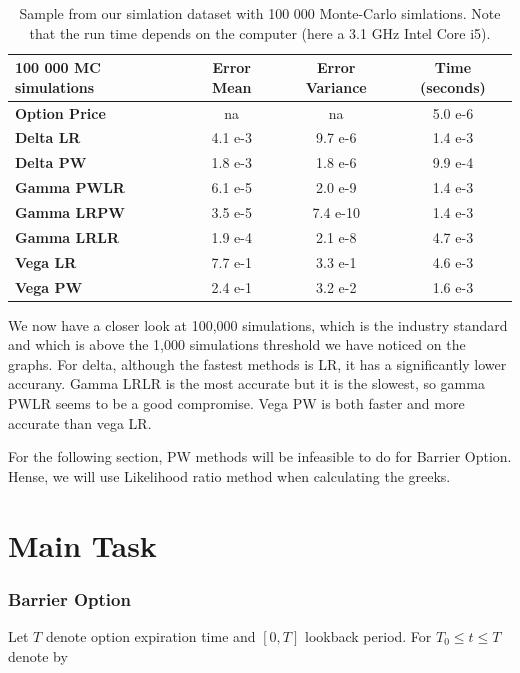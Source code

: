 \documentclass[11pt,a4paper,fleqn,draft]{article}
\begin{document}
\begin{table}
  \centering
\label{eco:values}
\begin{tabular}{|l|c|c|c|}
\hline
100 000 MC simulations      & \textbf{Error Mean} & \textbf{Error Variance} & \textbf{Time (seconds)} \\ \hline
\textbf{Option Price} & na &          na         & 5.0 e-6 \\ \hline
\textbf{Delta LR} & 4.1 e-3 & 9.7 e-6 & 1.4 e-3\\
\textbf{Delta PW} & 1.8 e-3 & 1.8 e-6 & 9.9 e-4\\ \hline
\textbf{Gamma PWLR} & 6.1 e-5 & 2.0 e-9 & 1.4 e-3\\
\textbf{Gamma LRPW} & 3.5 e-5 & 7.4 e-10 & 1.4 e-3\\
\textbf{Gamma LRLR} & 1.9 e-4 & 2.1 e-8 & 4.7 e-3\\ \hline
\textbf{Vega LR} & 7.7 e-1 & 3.3 e-1 & 4.6 e-3\\
\textbf{Vega PW} & 2.4 e-1 & 3.2 e-2 & 1.6 e-3\\ \hline
\end{tabular}

\caption{Sample from our simlation dataset with 100 000 Monte-Carlo simlations. Note that the run time depends on the computer (here a 3.1 GHz Intel Core i5).}

\end{table}

We now have a closer look at 100,000 simulations, which is the industry standard and which is above the 1,000 simulations threshold we have noticed on the graphs.
For delta, although the fastest methods is LR, it has a significantly lower accurany. Gamma LRLR is the most accurate but it is the slowest, so gamma PWLR seems to be a good compromise. Vega PW is both faster and more accurate than vega LR.

For the following section, PW methods will be infeasible to do for Barrier Option. Hense, we will use Likelihood ratio method when calculating the greeks.

\FloatBarrier

\part{Main Task}
\section{Barrier Option}

Let $T$ denote option expiration time and $[0,T]$ lookback period. For $T_0 \leq t\leq T$ denote by
\end{document}
